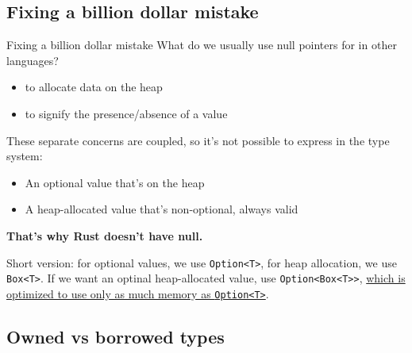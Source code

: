 \documentclass[
  9pt,
  ignorenonframetext,
]{beamer}
\newcommand{\passthrough}[1]{#1}
\providecommand{\tightlist}{%
  \setlength{\itemsep}{0pt}\setlength{\parskip}{0pt}}
\begin{document}
\hypertarget{fixing-a-billion-dollar-mistake}{%
\subsection{Fixing a billion dollar
mistake}\label{fixing-a-billion-dollar-mistake}}

\begin{frame}{Fixing a billion dollar mistake}
What do we usually use null pointers for in other languages?

\begin{itemize}
\tightlist
\item
  to allocate data on the heap
\item
  to signify the presence/absence of a value
\end{itemize}

These separate concerns are coupled, so it's not possible to express in
the type system:

\begin{itemize}
\tightlist
\item
  An optional value that's on the heap
\item
  A heap-allocated value that's non-optional, always valid
\end{itemize}
\end{frame}

\begin{frame}[fragile]
\textbf{That's why Rust doesn't have null.}

Short version: for optional values, we use
\passthrough{\lstinline!Option<T>!}, for heap allocation, we use
\passthrough{\lstinline!Box<T>!}. If we want an optinal heap-allocated
value, use \passthrough{\lstinline!Option<Box<T>>!},
\href{https://doc.rust-lang.org/std/option/\#representation}{which is
optimized to use only as much memory as
\passthrough{\lstinline!Option<T>!}}.
\end{frame}

\hypertarget{owned-vs-borrowed-types}{%
\subsection{Owned vs borrowed types}\label{owned-vs-borrowed-types}}
\end{document}
